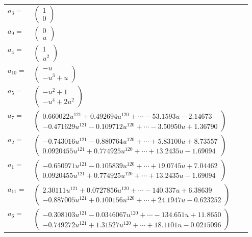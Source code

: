 \documentclass[1p]{elsarticle_modified}
\theoremstyle{definition}
\begin{document}
\begin{tabular}{m{7pt} m{180pt} m{7pt} m{180pt} }
\flushright $a_{3}=$&$\begin{pmatrix}1\\0\end{pmatrix}$ \\
\flushright $a_{9}=$&$\begin{pmatrix}0\\u\end{pmatrix}$ \\
\flushright $a_{4}=$&$\begin{pmatrix}1\\u^2\end{pmatrix}$ \\
\flushright $a_{10}=$&$\begin{pmatrix}- u\\- u^3+u\end{pmatrix}$ \\
\flushright $a_{5}=$&$\begin{pmatrix}- u^2+1\\- u^4+2 u^2\end{pmatrix}$ \\
\flushright $a_{7}=$&$\begin{pmatrix}0.660022 u^{121}+0.492694 u^{120}+\cdots-53.1593 u-2.14673\\-0.471629 u^{121}-0.109712 u^{120}+\cdots-3.50950 u+1.36790\end{pmatrix}$ \\
\flushright $a_{2}=$&$\begin{pmatrix}-0.743016 u^{121}-0.880764 u^{120}+\cdots+5.83100 u+8.73557\\0.0920455 u^{121}+0.774925 u^{120}+\cdots+13.2435 u-1.69094\end{pmatrix}$ \\
\flushright $a_{1}=$&$\begin{pmatrix}-0.650971 u^{121}-0.105839 u^{120}+\cdots+19.0745 u+7.04462\\0.0920455 u^{121}+0.774925 u^{120}+\cdots+13.2435 u-1.69094\end{pmatrix}$ \\
\flushright $a_{11}=$&$\begin{pmatrix}2.30111 u^{121}+0.0727856 u^{120}+\cdots-140.337 u+6.38639\\-0.887005 u^{121}+0.100156 u^{120}+\cdots+24.1947 u-0.623252\end{pmatrix}$ \\
\flushright $a_{6}=$&$\begin{pmatrix}-0.308103 u^{121}-0.0346067 u^{120}+\cdots-134.651 u+11.8650\\-0.749272 u^{121}+1.31527 u^{120}+\cdots+18.1101 u-0.0215096\end{pmatrix}$ \\

\end{tabular}
\end{document}
